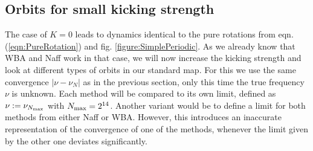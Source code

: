 \subsection{Orbits for small kicking strength}
The case of $K=0$ leads to dynamics identical to the pure rotations from eqn. (\ref{eqn:PureRotation}) and fig. \ref{figure:SimplePeriodic}. 
As we already know that WBA and Naff work in that case, we will now increase the kicking strength and look at different types of orbits in our standard map. 
For this we use the same convergence $|\nu-\nu_N|$ as in the previous section, only this time the true frequency $\nu$ is unknown. 
Each method will be compared to its own limit, defined as $\nu:=\nu_{N_\text{max}}$ with $N_\text{max}=2^{14}$.
Another variant would be to define a limit for both methods from either Naff or WBA. 
However, this introduces an inaccurate representation of the convergence of one of the methods, whenever the limit given by the other one deviates significantly.%
